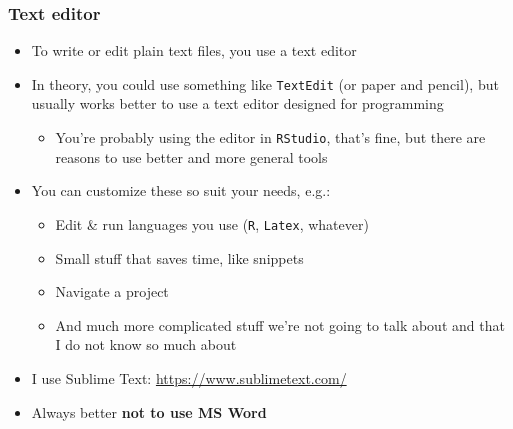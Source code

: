 \documentclass[utf8, xcolor=dvipsnames, handout]{beamer}
\begin{document}
\begin{frame}
\frametitle{Text editor}
\centering

\begin{itemize}[<+->]
  \item To write or edit plain text files, you use a text editor
  \item In theory, you could use something like \texttt{TextEdit} (or paper and pencil), but usually works better to use a text editor designed for programming
  \begin{itemize}
    \item You're probably using the editor in \texttt{RStudio}, that's fine, but there are reasons to use better and more general tools
  \end{itemize}
  \item You can customize these so suit your needs, e.g.:
  \begin{itemize}
    \item Edit \& run languages you use (\texttt{R}, \texttt{Latex}, whatever)
    \item Small stuff that saves time, like snippets
    \item Navigate a project
    \item And much more complicated stuff we're not going to talk about and that I do not know so much about
  \end{itemize}
  \item I use Sublime Text: \href{https://www.sublimetext.com/}{https://www.sublimetext.com/}
  \item Always better \textbf{not to use MS Word}
\end{itemize}

\end{frame}
\end{document}

